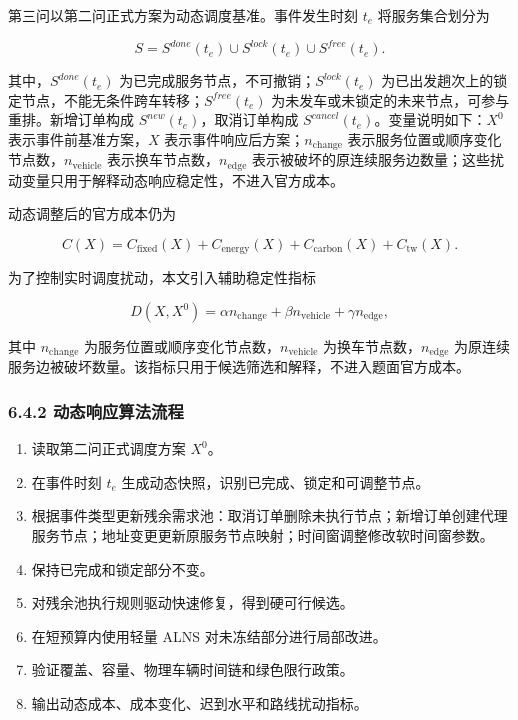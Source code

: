 \documentclass[UTF8,zihao=-4,a4paper]{ctexart}
\begin{document}
第三问以第二问正式方案为动态调度基准。事件发生时刻 \(t_e\) 将服务集合划分为

\[
S=S^{done}(t_e)\cup S^{lock}(t_e)\cup S^{free}(t_e).
\]

其中，\(S^{done}(t_e)\) 为已完成服务节点，不可撤销；\(S^{lock}(t_e)\) 为已出发趟次上的锁定节点，不能无条件跨车转移；\(S^{free}(t_e)\) 为未发车或未锁定的未来节点，可参与重排。新增订单构成 \(S^{new}(t_e)\)，取消订单构成 \(S^{cancel}(t_e)\)。变量说明如下：\(X^0\) 表示事件前基准方案，\(X\) 表示事件响应后方案；\(n_{\mathrm{change}}\) 表示服务位置或顺序变化节点数，\(n_{\mathrm{vehicle}}\) 表示换车节点数，\(n_{\mathrm{edge}}\) 表示被破坏的原连续服务边数量；这些扰动变量只用于解释动态响应稳定性，不进入官方成本。

动态调整后的官方成本仍为

\[
C(X)=C_{\mathrm{fixed}}(X)+C_{\mathrm{energy}}(X)+C_{\mathrm{carbon}}(X)+C_{\mathrm{tw}}(X).
\]

为了控制实时调度扰动，本文引入辅助稳定性指标

\[
D(X,X^0)=\alpha n_{\mathrm{change}}+\beta n_{\mathrm{vehicle}}+\gamma n_{\mathrm{edge}},
\]

其中 \(n_{\mathrm{change}}\) 为服务位置或顺序变化节点数，\(n_{\mathrm{vehicle}}\) 为换车节点数，\(n_{\mathrm{edge}}\) 为原连续服务边被破坏数量。该指标只用于候选筛选和解释，不进入题面官方成本。

\subsubsection{6.4.2 动态响应算法流程}

\begin{enumerate}[leftmargin=2em,itemsep=0.2em]
\item 读取第二问正式调度方案 \(X^0\)。
\item 在事件时刻 \(t_e\) 生成动态快照，识别已完成、锁定和可调整节点。
\item 根据事件类型更新残余需求池：取消订单删除未执行节点；新增订单创建代理服务节点；地址变更更新原服务节点映射；时间窗调整修改软时间窗参数。
\item 保持已完成和锁定部分不变。
\item 对残余池执行规则驱动快速修复，得到硬可行候选。
\item 在短预算内使用轻量 ALNS 对未冻结部分进行局部改进。
\item 验证覆盖、容量、物理车辆时间链和绿色限行政策。
\item 输出动态成本、成本变化、迟到水平和路线扰动指标。
\end{enumerate}
\end{document}
